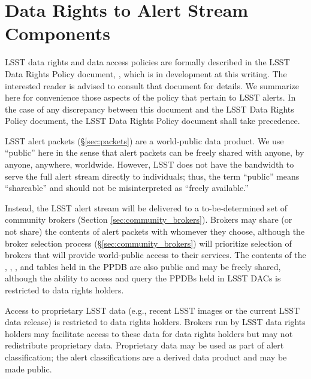 \section{Data Rights to Alert Stream Components}\label{sec:data_rights}

LSST data rights and data access policies are formally described in the LSST Data Rights Policy document, , which is in development at this writing.
The interested reader is advised to consult that document for details.
We summarize here for convenience those aspects of the policy that pertain to LSST alerts.
In the case of any discrepancy between this document and the LSST Data Rights Policy document, the LSST Data Rights Policy document shall take precedence.

LSST alert packets (\S \ref{sec:packets}) are a world-public data product.
We use ``public'' here in the sense that alert packets can be freely shared with anyone, by anyone, anywhere, worldwide.
However, LSST does not have the bandwidth to serve the full alert stream directly to individuals; thus, the term ``public'' means ``shareable'' and should not be misinterpreted as ``freely available.''

Instead, the LSST alert stream will be delivered to a to-be-determined set of community brokers (Section \ref{sec:community_brokers}).
Brokers may share (or not share) the contents of alert packets with whomever they choose, although the broker selection process (\S \ref{sec:community_brokers}) will prioritize selection of brokers that will provide world-public access to their services.
The contents of the \DIAObject, \DIASource, \DIAForcedSource, and \SSObject tables held in the PPDB are also public and may be freely shared, although the ability to access and query the PPDBs held in LSST DACs is restricted to data rights holders.

Access to proprietary LSST data (e.g., recent LSST images or the current LSST data release) is restricted to data rights holders.  
Brokers run by LSST data rights holders may facilitate access to these data for data rights holders but may not redistribute proprietary data. 
Proprietary data may be used as part of alert classification; the alert classifications are a derived data product and may be made public.

